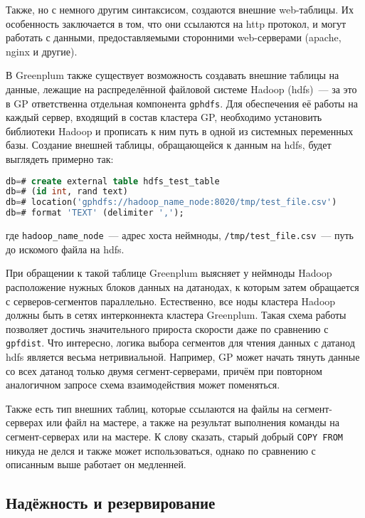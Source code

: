 Также, но с немного другим синтаксисом, создаются внешние web-таблицы. Их особенность заключается в том, что они ссылаются на http протокол, и могут работать с данными, предоставляемыми сторонними web-серверами (apache, nginx и другие).

В Greenplum также существует возможность создавать внешние таблицы на данные, лежащие на распределённой файловой системе Hadoop (hdfs)~--- за это в GP ответственна отдельная компонента \lstinline!gphdfs!. Для обеспечения её работы на каждый сервер, входящий в состав кластера GP, необходимо установить библиотеки Hadoop и прописать к ним путь в одной из системных переменных базы. Создание внешней таблицы, обращающейся к данным на hdfs, будет выглядеть примерно так:

\begin{lstlisting}[language=SQL,label=lst:greenplum_example5,caption=Пример с gphdfs]
db=# create external table hdfs_test_table
db=# (id int, rand text)
db=# location('gphdfs://hadoop_name_node:8020/tmp/test_file.csv')
db=# format 'TEXT' (delimiter ',');
\end{lstlisting}

где \lstinline!hadoop_name_node!~--- адрес хоста неймноды, \lstinline!/tmp/test_file.csv!~--- путь до искомого файла на hdfs.

При обращении к такой таблице Greenplum выясняет у неймноды Hadoop расположение нужных блоков данных на датанодах, к которым затем обращается с серверов-сегментов параллельно. Естественно, все ноды кластера Hadoop должны быть в сетях интерконнекта кластера Greenplum. Такая схема работы позволяет достичь значительного прироста скорости даже по сравнению с \lstinline!gpfdist!. Что интересно, логика выбора сегментов для чтения данных с датанод hdfs является весьма нетривиальной. Например, GP может начать тянуть данные со всех датанод только двумя сегмент-серверами, причём при повторном аналогичном запросе схема взаимодействия может поменяться.

Также есть тип внешних таблиц, которые ссылаются на файлы на сегмент-серверах или файл на мастере, а также на результат выполнения команды на сегмент-серверах или на мастере. К слову сказать, старый добрый \lstinline!COPY FROM! никуда не делся и также может использоваться, однако по сравнению с описанным выше работает он медленней.


\subsection{Надёжность и резервирование}


